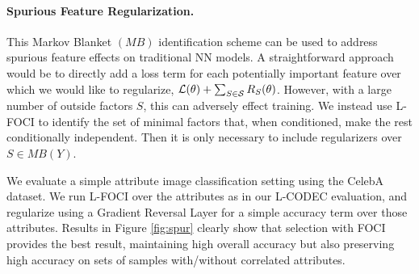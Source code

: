 \paragraph{Spurious Feature Regularization.}
This Markov Blanket $(MB)$ identification scheme can be used to address spurious feature effects on traditional NN models.
A straightforward approach would be to directly add a loss term for each potentially important feature over which we would like to regularize, 
$\mathcal{L}(\theta) + \sum_{S\in \mathcal{S}} R_S(\theta)$.
However, with a large number of outside factors $S$, this can adversely effect training.
We instead use L-FOCI to identify the set of minimal factors that, when conditioned, make the rest conditionally independent. Then it is only necessary to include regularizers over $S \in MB(Y)$.

We evaluate a simple attribute image classification setting using the CelebA dataset. We run L-FOCI over the attributes as in our L-CODEC evaluation, and regularize using a Gradient Reversal Layer for a simple accuracy term over those attributes.
Results in Figure \ref{fig:spur} clearly show that selection with FOCI provides the best result, maintaining high overall accuracy but also preserving high accuracy on sets of samples with/without correlated attributes.

